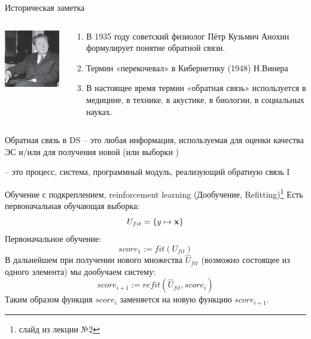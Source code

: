 \begin{frame}{Историческая заметка}
	\begin{columns}
		\begin{column}{0.5\textwidth}
			\includegraphics[width=5cm]{../pic/anohin.jpg}
		\end{column}
		\begin{column}{0.6\textwidth}
			\begin{enumerate}
				\item В 1935 году советский физиолог
				Пётр Кузьмич Анохин формулирует понятие обратной связи.
				\item Термин «перекочевал» в Кибернетику (1948) Н.Винера
				\item В настоящее время термин «обратная связь» используется в медицине, в технике, в акустике, в биологии, в социальных науках.
			\end{enumerate}
		\end{column}
	\end{columns}
\end{frame}

\begin{frame}{Обратная связь в DS}
	  --
	это любая информация, используемая для оценки качества ЭС
	и/или для получения новой  (или выборки )
	
	 -- это процесс, система, 
	программный модуль, реализующий обратную связь I
\end{frame}

\begin{frame}{Обучение с подкреплением, reinforcement learning (Дообучение, Refitting)\footnote{слайд из лекции №2}}
	\small
	Есть первоначальная обучающая выборка: 
	\begin{equation*}
		U_{fit} = \left\{ y \mapsto \bold x  \right\}
	\end{equation*}
	Первоначальное обучение:
	\begin{equation*}
		score_1 := fit (U_{fit}) 
	\end{equation*} 
	В дальнейшем при получении нового множества $\hat U_{fit}$ (возможно состоящее из одного элемента)
	мы дообучаем систему:
	\begin{equation}
		score_{i+1} := refit (\hat U_{fit}, score_{i}) 
	\end{equation} 
	Таким образом функция $score_i$ заменяется на новую функцию $score_{i+1}$.
\end{frame}

